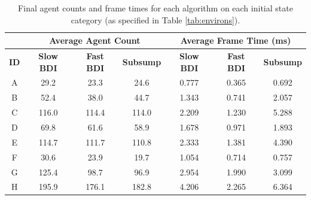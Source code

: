 \documentclass[12pt,a4paper]{article}
\begin{document}
\begin{table}[ht]
\centering
\begin{tabular}{|c|c|c|c|c|c|c|} \hline
& \multicolumn{3}{c|}{\bf Average Agent Count} & \multicolumn{3}{c|}{\bf Average Frame Time (ms)} \\ \hline
{\bf \small ID} & {\bf \small Slow BDI} & {\bf \small Fast BDI} & {\bf \small Subsump} & {\bf \small Slow BDI} & {\bf \small Fast BDI} & {\bf \small Subsump} \\ \hline
A & 29.2 & 23.3 & 24.6 & 0.777 & 0.365 & 0.692 \\
B & 52.4 & 38.0 & 44.7 & 1.343 & 0.741 & 2.057 \\
C & 116.0 & 114.4 & 114.0 & 2.209 & 1.230 & 5.288 \\ \hline
D & 69.8 & 61.6 & 58.9 & 1.678 & 0.971 & 1.893 \\
E & 114.7 & 111.7 & 110.8 & 2.333 & 1.381 & 4.390 \\
F & 30.6 & 23.9 & 19.7 & 1.054 & 0.714 & 0.757 \\
G & 125.4 & 98.7 & 96.9 & 2.954 & 1.990 & 3.099 \\
H & 195.9 & 176.1 & 182.8 & 4.206 & 2.265 & 6.364 \\ \hline
\end{tabular}
\caption{Final agent counts and frame times for each algorithm on each initial state category (as specified in Table \ref{tab:environs}).}
\label{tab:results}
\vspace{-20mm}
\end{table}
\end{document}
